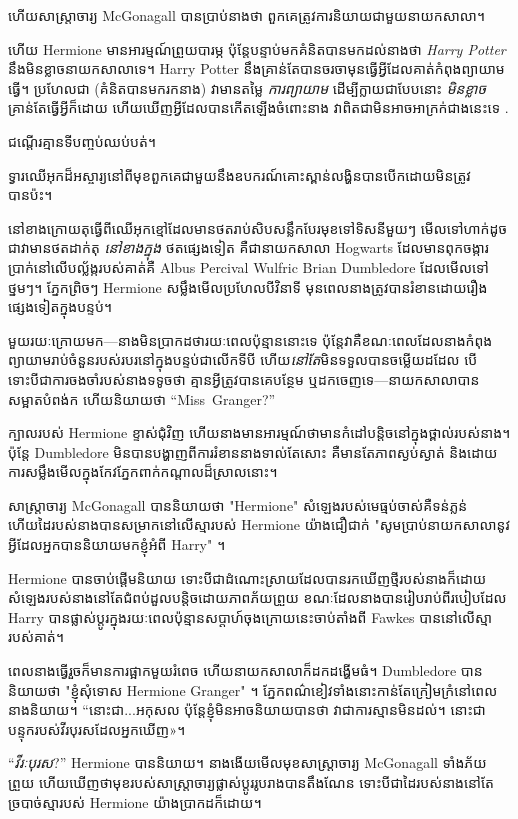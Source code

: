 {{ហើយសាស្រ្តាចារ្យ McGonagall បានប្រាប់នាងថា ពួកគេត្រូវការនិយាយជាមួយនាយកសាលា។

ហើយ Hermione មាន​អារម្មណ៍​ព្រួយ​បារម្ភ ប៉ុន្តែ​បន្ទាប់​មក​គំនិត​បាន​មក​ដល់​នាង​ថា \emph{Harry Potter} នឹង​មិន​ខ្លាច​នាយក​សាលា​ទេ។ Harry Potter នឹង​គ្រាន់តែ​បាន​ចរចា​មុន​ធ្វើ​អ្វី​ដែល​គាត់​កំពុង​ព្យាយាម​ធ្វើ។ ប្រហែលជា (គំនិតបានមករកនាង) វាមានតម្លៃ \emph{ការព្យាយាម} ដើម្បីក្លាយជាបែបនោះ \emph{មិនខ្លាច} គ្រាន់តែធ្វើអ្វីក៏ដោយ ហើយឃើញអ្វីដែលបានកើតឡើងចំពោះនាង វាពិតជាមិនអាចអាក្រក់ជាងនេះទេ .

ជណ្តើរគ្មានទីបញ្ចប់ឈប់បត់។

ទ្វារឈើអុកដ៏អស្ចារ្យនៅពីមុខពួកគេជាមួយនឹងឧបករណ៍គោះស្ពាន់លង្ហិនបានបើកដោយមិនត្រូវបានប៉ះ។

នៅខាងក្រោយតុធ្វើពីឈើអុកខ្មៅដែលមានថតរាប់សិបសន្លឹកបែរមុខទៅទិសនីមួយៗ មើលទៅហាក់ដូចជាវាមានថតដាក់តុ \emph{នៅខាងក្នុង} ថតផ្សេងទៀត គឺជានាយកសាលា Hogwarts ដែលមានពុកចង្ការប្រាក់នៅលើបល្ល័ង្ករបស់គាត់គឺ Albus Percival Wulfric Brian Dumbledore ដែលមើលទៅថ្នមៗ។ ភ្នែក​ព្រិចៗ Hermione សម្លឹង​មើល​ប្រហែល​បី​វិនាទី មុន​ពេល​នាង​ត្រូវ​បាន​រំខាន​ដោយ​រឿង​ផ្សេង​ទៀត​ក្នុង​បន្ទប់។

មួយរយៈក្រោយមក—នាងមិនប្រាកដថារយៈពេលប៉ុន្មាននោះទេ ប៉ុន្តែវាគឺខណៈពេលដែលនាងកំពុងព្យាយាមរាប់ចំនួនរបស់របរនៅក្នុងបន្ទប់ជាលើកទីបី ហើយ\emph{នៅតែ}មិនទទួលបានចម្លើយដដែល បើទោះបីជាការចងចាំរបស់នាងទទូចថា គ្មាន​អ្វី​ត្រូវ​បាន​គេ​បន្ថែម ឬ​ដក​ចេញ​ទេ—នាយក​សាលា​បាន​សម្អាត​បំពង់ក ហើយ​និយាយ​ថា “Miss~Granger?”

ក្បាលរបស់ Hermione ខ្ទាស់ជុំវិញ ហើយនាងមានអារម្មណ៍ថាមានកំដៅបន្តិចនៅក្នុងថ្ពាល់របស់នាង។ ប៉ុន្តែ Dumbledore មិន​បាន​បង្ហាញ​ពី​ការ​រំខាន​នាង​ទាល់​តែ​សោះ គឺ​មាន​តែ​ភាព​ស្ងប់ស្ងាត់ និង​ដោយ​ការ​សម្លឹង​មើល​ក្នុង​កែវ​ភ្នែក​ពាក់​កណ្ដាល​ដ៏​ស្រាល​នោះ។

សាស្ត្រាចារ្យ McGonagall បាននិយាយថា "Hermione" សំឡេងរបស់មេធ្មប់ចាស់គឺទន់ភ្លន់ ហើយដៃរបស់នាងបានសម្រាកនៅលើស្មារបស់ Hermione យ៉ាងជឿជាក់ "សូមប្រាប់នាយកសាលានូវអ្វីដែលអ្នកបាននិយាយមកខ្ញុំអំពី Harry" ។

Hermione បានចាប់ផ្តើមនិយាយ ទោះបីជាដំណោះស្រាយដែលបានរកឃើញថ្មីរបស់នាងក៏ដោយ សំឡេងរបស់នាងនៅតែជំពប់ដួលបន្តិចដោយភាពភ័យព្រួយ ខណៈដែលនាងបានរៀបរាប់ពីរបៀបដែល Harry បានផ្លាស់ប្តូរក្នុងរយៈពេលប៉ុន្មានសប្តាហ៍ចុងក្រោយនេះចាប់តាំងពី Fawkes បាននៅលើស្មារបស់គាត់។

ពេល​នាង​ធ្វើ​រួច​ក៏​មាន​ការ​ផ្អាក​មួយ​រំពេច ហើយ​នាយក​សាលា​ក៏​ដក​ដង្ហើម​ធំ។ Dumbledore បាននិយាយថា "ខ្ញុំសុំទោស Hermione Granger" ។ ភ្នែកពណ៌ខៀវទាំងនោះកាន់តែក្រៀមក្រំនៅពេលនាងនិយាយ។ “នោះជា...អកុសល ប៉ុន្តែខ្ញុំមិនអាចនិយាយបានថា វាជាការស្មានមិនដល់។ នោះ​ជា​បន្ទុក​របស់​វីរបុរស​ដែល​អ្នក​ឃើញ»។

“\emph{វីរៈបុរស}?” Hermione បាននិយាយ។ នាងងើយមើលមុខសាស្ត្រាចារ្យ McGonagall ទាំងភ័យព្រួយ ហើយឃើញថាមុខរបស់សាស្ត្រាចារ្យផ្លាស់ប្តូររូបរាងបានតឹងណែន ទោះបីជាដៃរបស់នាងនៅតែច្របាច់ស្មារបស់ Hermione យ៉ាងប្រាកដក៏ដោយ។

}}
